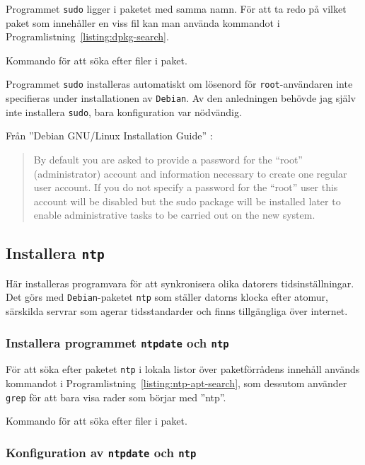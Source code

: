 Programmet \texttt{sudo} ligger i paketet med samma namn.
För att ta redo på vilket paket som innehåller en viss fil kan man använda
kommandot i Programlistning~\ref{listing:dpkg-search}.

\begin{listing}[H]
\caption{Kommando för att söka efter filer i paket.}
\label{listing:dpkg-search}
\end{listing}

Programmet \texttt{sudo} installeras automatiskt om lösenord för
\texttt{root}-användaren inte specifieras under installationen av
\texttt{Debian}.  Av den anledningen behövde jag själv inte installera
\texttt{sudo}, bara konfiguration var nödvändig.

Från ''Debian GNU\slash Linux Installation Guide''
\cite{debian:install}:

\begin{quotation}
By default you are asked to provide a password for the “root” (administrator)
account and information necessary to create one regular user account. If you do
not specify a password for the “root” user this account will be disabled but
the sudo package will be installed later to enable administrative tasks to be
carried out on the new system. 
\end{quotation}




\subsection{Installera \texttt{ntp}}
Här installeras programvara för att synkronisera olika datorers
tidsinställningar.  Det görs med \texttt{Debian}-paketet \texttt{ntp} som
ställer datorns klocka efter atomur, särskilda servrar som agerar
tidsstandarder och finns tillgängliga över internet.

\subsubsection{Installera programmet \texttt{ntpdate} och \texttt{ntp}}
För att söka efter paketet \texttt{ntp} i lokala listor över paketförrådens
innehåll används kommandot i Programlistning~\ref{listing:ntp-apt-search},
som dessutom använder \texttt{grep} för att bara visa rader som börjar med
''ntp''.

\begin{listing}[H]
\caption{Kommando för att söka efter filer i paket.}
\label{listing:ntp-apt-search}
\end{listing}

\subsubsection{Konfiguration av \texttt{ntpdate} och \texttt{ntp}}
%


